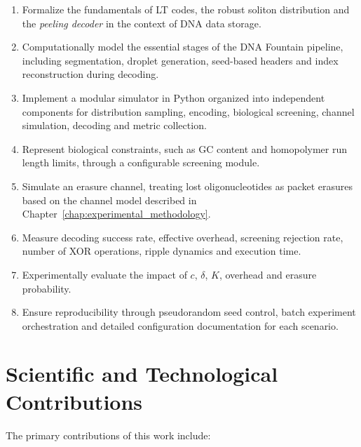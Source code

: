 \begin{enumerate}
    \item Formalize the fundamentals of LT codes, the robust soliton distribution and the \emph{peeling decoder} in the context of DNA data storage.
    
    \item Computationally model the essential stages of the DNA Fountain pipeline, including segmentation, droplet generation, seed-based headers and index reconstruction during decoding.
    
    \item Implement a modular simulator in Python organized into independent components for distribution sampling, encoding, biological screening, channel simulation, decoding and metric collection.
    
    \item Represent biological constraints, such as GC content and homopolymer run length limits, through a configurable screening module.
    
    \item Simulate an erasure channel, treating lost oligonucleotides as packet erasures based on the channel model described in Chapter~\ref{chap:experimental_methodology}.
    
    \item Measure decoding success rate, effective overhead, screening rejection rate, number of XOR operations, ripple dynamics and execution time.
    
    \item Experimentally evaluate the impact of $c$, $\delta$, $K$, overhead and erasure probability.
    
    \item Ensure reproducibility through pseudorandom seed control, batch experiment orchestration and detailed configuration documentation for each scenario.
\end{enumerate}

\section{Scientific and Technological Contributions}
\label{sec:contributions}

The primary contributions of this work include:


